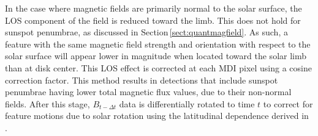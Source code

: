 In the case where magnetic fields are primarily normal to the solar surface, the \gls{LOS} component of the field is reduced toward the limb. This does not hold for sunspot penumbrae, as discussed in Section\,\ref{sect:quantmagfield}. As such, a feature with the same magnetic field strength and orientation with respect to the solar surface will appear lower in magnitude when located toward the solar limb than at disk center. This \gls{LOS} effect is corrected at each \gls{MDI} pixel using a cosine correction factor. This method results in detections that include sunspot penumbrae having lower total magnetic flux values, due to their non-normal fields. %
After this stage, $B_{t-\Delta t}$ data is differentially rotated to time $t$ to correct for feature motions due to solar rotation using the latitudinal dependence derived in \citet{Howard:1990}.

